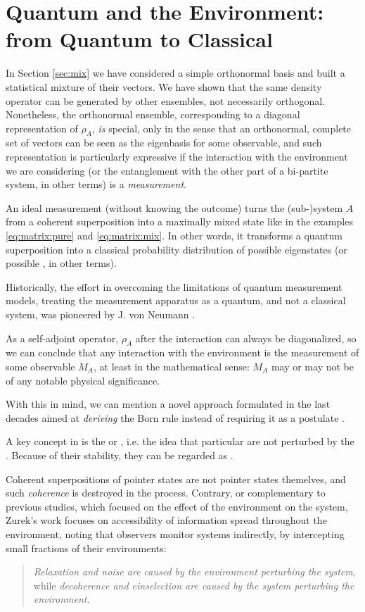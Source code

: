 \section{Quantum and the Environment: from Quantum to Classical}
\label{sec:q2c}

In Section \ref{sec:mix} we have considered a simple orthonormal basis
and built a statistical mixture of their vectors. We have shown
that the same density operator can be generated by other ensembles,
not necessarily orthogonal. Nonetheless, the orthonormal ensemble,
corresponding to a diagonal representation of $\rho_A$, \emph{is}
special, only in the sense that an orthonormal, complete set of
vectors can be seen as the eigenbasis for some observable,
and such representation is particularly expressive if the
interaction with the environment we are considering
(or the entanglement with the other part of a bi-partite system, in other terms)
is a \emph{measurement}.

An ideal measurement (without knowing the outcome) turns
the (sub-)system $A$ from a coherent superposition into a
maximally mixed state like in the examples
\eqref{eq:matrix:pure} and \eqref{eq:matrix:mix}.
In other words, it transforms a quantum superposition into a classical probability
distribution of possible eigenstates (or possible , in other terms).

Historically,
the effort in overcoming the limitations of quantum measurement models,
treating the measurement apparatus as a quantum,
and not a classical system,
was pioneered by J. von Neumann \parencite{VonNeumann}.

As a self-adjoint operator, $\rho_A$ after the interaction
can always be diagonalized, so we can conclude that any
interaction with the environment is the measurement of some
observable $M_A$, at least in the mathematical sense: $M_A$ may or
may not be of any notable physical significance.

With this in mind, we can mention
a novel approach formulated in the last decades aimed at
\emph{deriving}
the Born rule
instead of requiring it as a postulate
\parencite{Zurek_Einselect}.

A key concept in \cite{Zurek_Einselect} is the
 or ,
i.e. the idea that particular  are not
perturbed by the .
Because of their stability, they can be regarded as
.

Coherent superpositions of pointer states are not pointer states
themelves, and such \emph{coherence} is destroyed in the process. 
Contrary,
or complementary to previous studies, which focused on the effect of
the environment on the system, Zurek's work
focuses on
accessibility of information spread throughout the environment,
noting that observers monitor systems indirectly, by intercepting
small fractions of their environments:
\begin{quote}
\emph{Relaxation and noise are caused by the environment perturbing
the system}, while \emph{decoherence and einselection
are caused by the system perturbing the environment}.
\end{quote}

